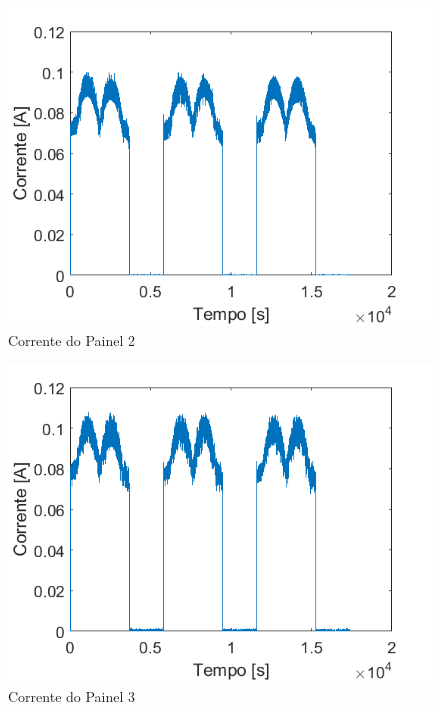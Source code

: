 \begin{figure}[!htpb]
\begin{center}
\includegraphics[scale=0.5]{figures/testPanel2Current.png}
\caption{Corrente do Painel 2}
\label{figura_teste_corrente_painel2}
\end{center}
\end{figure}

\begin{figure}[!htpb]
\begin{center}
\includegraphics[scale=0.5]{figures/testPanel3Current.png}
\caption{Corrente do Painel 3}
\label{figura_teste_corrente_painel3}
\end{center}
\end{figure}

